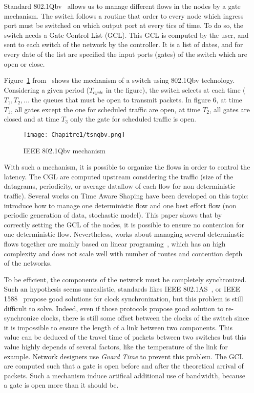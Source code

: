 Standard 802.1Qbv~\cite{8613095} allows us to manage different flows in the nodes by a gate mechanism. The switch follows a routine that order to every node which ingress port must be switched on which output port at every tics of time. To do so, the switch needs a Gate Control List (GCL). This GCL is computed by the user, and sent to each switch of the network by the controller. It is a list of dates, and for every date of the list are specified the input ports (gates) of the switch which are open or close.


Figure~\ref{fig:tsnqbv} from~\cite{durr2016no} shows the mechanism of a switch using 802.1Qbv technology. Considering a given period ($T_{cycle}$ in the figure), the switch selects at each time ($T_1 , T_2 , \ldots$ the queues that must be open to transmit packets. In figure 6, at time $T_1$, all gates except the one for scheduled traffic are open, at time $T_2$, all gates are closed and at time $T_3$ only the gate for scheduled traffic is open.

  \begin{figure}
  \begin{center}
  \texttt{[image: Chapitre1/tsnqbv.png]}
  \end{center}
  \caption{IEEE 802.1Qbv mechanism}\label{fig:tsnqbv}
  \end{figure}
      
With such a mechanism, it is possible to organize the flows in order to control the latency. The CGL are computed upstream considering the traffic (size of the datagrams, periodicity, or average dataflow of each flow for non deterministic traffic). Several works on Time Aware Shaping have been developed on this topic: \cite{al2017modeling} introduce how to manage one deterministic flow and one best effort flow (non periodic generation of data, stochastic model). This paper shows that by correctly setting the GCL of the nodes, it is possible to ensure no contention for one deterministic flow. Nevertheless, works about managing several determinstic flows together are mainly based on linear programing~\cite{steiner2018traffic,silviu2017,nayak2017incremental,naresh2016}, which has an high complexity and does not scale well with number of routes and contention depth of the networks.


To be efficient, the components of the network must be completely synchronized. Such an hypothesis seems unrealistic, standards likes IEEE 802.1AS~\cite{5741898}, or IEEE 1588~\cite{4579760} propose good solutions for clock synchronization, but this problem is still difficult to solve. Indeed, even if those protocols propose good solution to re-synchronize clocks, there is still some offset between the clocks of the switch since it is impossible to ensure the length of a link between two components. This value can be deduced of the travel time of packets between two switches but this value highly depends of several factors, like the temperature of the link for example. Network designers use {\em Guard Time} to prevent this problem. The GCL are computed such that a gate is open before and after the theoretical arrival of packets. Such a mechanism induce artifical additional use of bandwidth, because a gate is open more than it should be.

